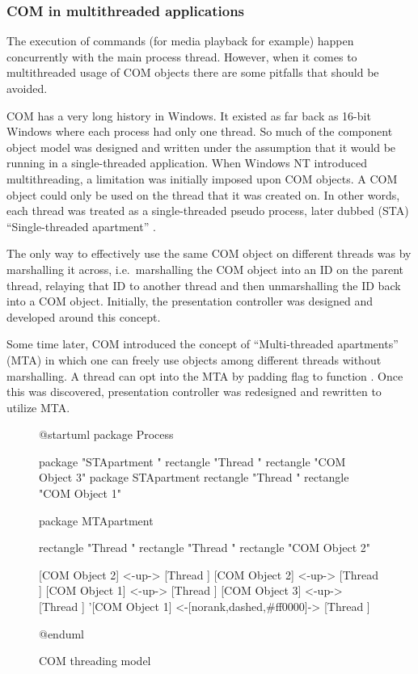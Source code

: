 \documentclass[12pt, fleqn, a4paper]{article}
\begin{document}
\subsubsection{COM in multithreaded applications}
The execution of commands (for media playback for example) happen concurrently with the main process thread. However, when it comes to multithreaded usage of COM objects there are some pitfalls that should be avoided.\par
COM has a very long history in Windows. It existed as far back as 16-bit Windows where each process had only one thread. So much of the component object model was designed and written under the assumption that it would be running in a single-threaded application. When Windows NT introduced multithreading, a limitation was initially imposed upon COM objects. A COM object could only be used on the thread that it was created on. In other words, each thread was treated as a single-threaded pseudo process, later dubbed (STA) \enquote{Single-threaded apartment} \citep{chen_2019}.\par
The only way to effectively use the same COM object on different threads was by marshalling it across, i.e.\ marshalling the COM object into an ID on the parent thread, relaying that ID to another thread and then unmarshalling the ID back into a COM object. Initially, the presentation controller was designed and developed around this concept.\par
Some time later, COM introduced the concept of \enquote{Multi-threaded apartments} (MTA) in which one can freely use objects among different threads without marshalling. A thread can opt into the MTA by padding  flag to function  \citep{pywin32}. Once this was discovered, presentation controller was redesigned and rewritten to utilize MTA.
\begin{figure}[H]
	\centering
	\begin{plantuml}
@startuml
package Process {
  package "STApartment " {
    rectangle "Thread    " 
    rectangle "COM Object 3"
  }
  package STApartment {
    rectangle "Thread " 
    rectangle "COM Object 1"
  }

  package MTApartment {
    rectangle "Thread  "
    rectangle "Thread   "
    rectangle "COM Object 2" 
    
  }
}
[COM Object 2] <-up-> [Thread  ]
[COM Object 2] <-up-> [Thread   ]
[COM Object 1] <-up-> [Thread ]
[COM Object 3] <-up-> [Thread    ]
'[COM Object 1] <-[norank,dashed,#ff0000]-> [Thread    ]

@enduml
	\end{plantuml}
	\caption{COM threading model}
\end{figure}
\end{document}
